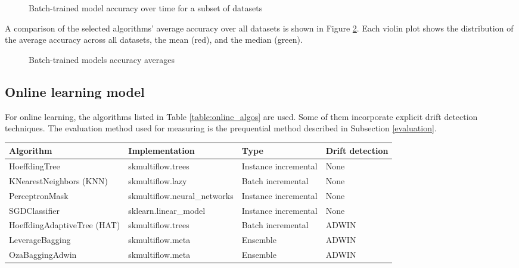 \documentclass{sig-alternate-br}
\begin{document}
\begin{figure}[h]
\centering 
{}
\caption{Batch-trained model accuracy over time for a subset of datasets}
\label{fig:batchdt}
\end{figure}

A comparison of the selected algorithms' average accuracy over all datasets is shown in Figure \ref{fig:batch_violins}. Each violin plot shows the distribution of the average accuracy across all datasets, the mean (red), and the median (green).

\vspace{3cm}

\begin{figure}[h]
\centering 
{}
\caption{Batch-trained models accuracy averages}
\label{fig:batch_violins}
\end{figure}

\subsection{Online learning model}

For online learning, the algorithms listed in Table \ref{table:online_algos} are used. Some of them incorporate explicit drift detection techniques. The evaluation method used for measuring is the prequential method described in Subsection \ref{evaluation}.

\begin{table*}[h]
\centering
\renewcommand{\arraystretch}{1.25}
\begin{tabular}{|l|l|l|l|} \hline
\textbf{Algorithm} & \textbf{Implementation} & \textbf{Type}  & \textbf{Drift detection} \\ \hline
HoeffdingTree & skmultiflow.trees &  Instance incremental & None \\ \hline
KNearestNeighbors (KNN) & skmultiflow.lazy & Batch incremental & None \\ \hline
PerceptronMask & skmultiflow.neural\_networks & Instance incremental & None \\ \hline
SGDClassifier & sklearn.linear\_model & Instance incremental &  None \\ \hline
HoeffdingAdaptiveTree (HAT) & skmultiflow.trees & Batch incremental & ADWIN \\ \hline
LeverageBagging  & skmultiflow.meta & Ensemble &  ADWIN \\ \hline
OzaBaggingAdwin & skmultiflow.meta & Ensemble & ADWIN \\ \hline
\end{tabular}
\caption{Classifiers used for online learning}
\label{table:online_algos}
\end{table*}
\end{document}
